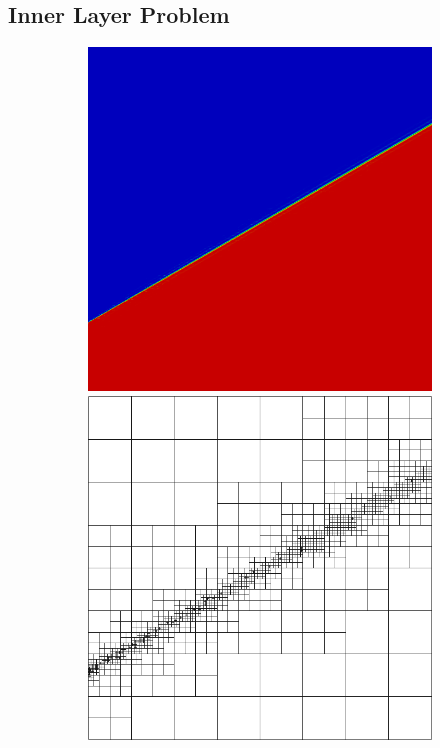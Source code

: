 \documentclass[letterpaper]{article}
\begin{document}
\subsection{Inner Layer Problem}

\begin{figure}
\centering
\begin{subfigure}[t]{0.45\textwidth}
\centering
\includegraphics[width=\textwidth]{figs/InnerLayer/graph8nc.png}
\includegraphics[width=\textwidth]{figs/InnerLayer/graph8nc_mesh.png}

\end{subfigure}
\end{figure}
\end{document}
